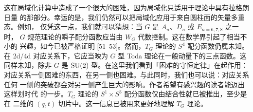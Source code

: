 
这在局域化计算中造成了一个很大的困难，因为局域化只适用于理论中具有拉格朗日量
的那部分。幸运的是，我们仍然可以把局域化应用于来自圆柱面的矢量多重态。例如，
仅凭这一点，我们就可以猜想：当 $G$ 是 $A_n$、$D_n$ 或 $E_{n=6,7,8}$ 之一时，
$G$ 规范理论的瞬子配分函数应当由 $W_G$ 代数控制。这在数学界引起了相当不小的
兴趣，如今已被严格证明 [51--53]。然而，$T_G$ 理论的 $S^4$ 配分函数仍属未知。
在 2d/4d 对应关系下，它应当映为 $G$ 型 Toda 理论在一般动量下的三点函数。这
同样未知，除非 $G$ 是 $\mathrm{SU}(2)$ 型。在这里我们看到「困难的守恒定律」在起作用：
对应关系一侧困难的东西，在另一侧也困难。与此同时，我们也可以说：对应关系任何
一侧的突破都会对另一侧产生巨大的影响。作者希望有感兴趣的读者能迈出这样划时代
的一步。$T_G$ 理论的 $S^1\times S^3$ 配分函数仅由结合性就已被推出，至少是在
二维的 $(q,t)$ 切片中。这一信息已被用来更好地理解 $T_G$ 理论。


